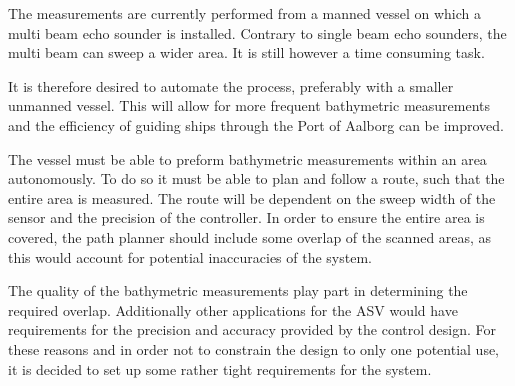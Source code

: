The measurements are currently performed from a manned vessel on which a multi beam echo sounder is installed. Contrary to single beam echo sounders, the multi beam can sweep a wider area. It is still however a time consuming task.

It is therefore desired to automate the process, preferably with a smaller unmanned vessel. This will allow for more frequent bathymetric measurements and the efficiency of guiding ships through the Port of Aalborg can be improved.

The vessel must be able to preform bathymetric measurements within an area autonomously. 
To do so it must be able to plan and follow a route, such that the entire area is measured. 
The route will be dependent on the sweep width of the sensor and the precision of the controller.
In order to ensure the entire area is covered, the path planner should include some overlap of the scanned areas, as this would account for potential inaccuracies of the system.





The quality of the bathymetric measurements play part in determining the required overlap. Additionally other applications for the ASV would have requirements for the precision and accuracy provided by the control design. For these reasons and in order not to constrain the design to only one potential use, it is decided to set up some rather tight requirements for the system.

